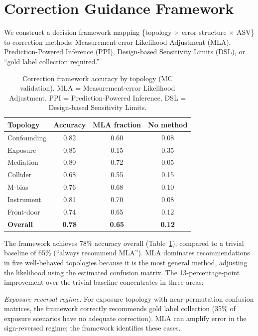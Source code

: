 \documentclass[11pt]{article}
\begin{document}
\section{Correction Guidance Framework}\label{sec:correction}

We construct a decision framework mapping \{topology $\times$ error structure $\times$ ASV\} to correction methods: Measurement-error Likelihood Adjustment (MLA), Prediction-Powered Inference (PPI), Design-based Sensitivity Limits (DSL), or ``gold label collection required.''

\begin{table}[t]
\centering
\caption{Correction framework accuracy by topology (MC validation). MLA = Measurement-error Likelihood Adjustment, PPI = Prediction-Powered Inference, DSL = Design-based Sensitivity Limits.}
\label{tab:correction-framework}
\small
\begin{tabular}{lccc}
\toprule
Topology & Accuracy & MLA fraction & No method \\
\midrule
Confounding & 0.82 & 0.60 & 0.08 \\
Exposure & 0.85 & 0.15 & 0.35 \\
Mediation & 0.80 & 0.72 & 0.05 \\
Collider & 0.68 & 0.55 & 0.15 \\
M-bias & 0.76 & 0.68 & 0.10 \\
Instrument & 0.81 & 0.70 & 0.08 \\
Front-door & 0.74 & 0.65 & 0.12 \\
\midrule
\textbf{Overall} & \textbf{0.78} & \textbf{0.65} & \textbf{0.12} \\
\bottomrule
\end{tabular}
\end{table}

The framework achieves 78\% accuracy overall (Table~\ref{tab:correction-framework}), compared to a trivial baseline of 65\% (``always recommend MLA'').
MLA dominates recommendations in five well-behaved topologies because it is the most general method, adjusting the likelihood using the estimated confusion matrix.
The 13-percentage-point improvement over the trivial baseline concentrates in three areas:

\textit{Exposure reversal regime.}
For exposure topology with near-permutation confusion matrices, the framework correctly recommends gold label collection (35\% of exposure scenarios have no adequate correction).
MLA can amplify error in the sign-reversed regime; the framework identifies these cases.
\end{document}
